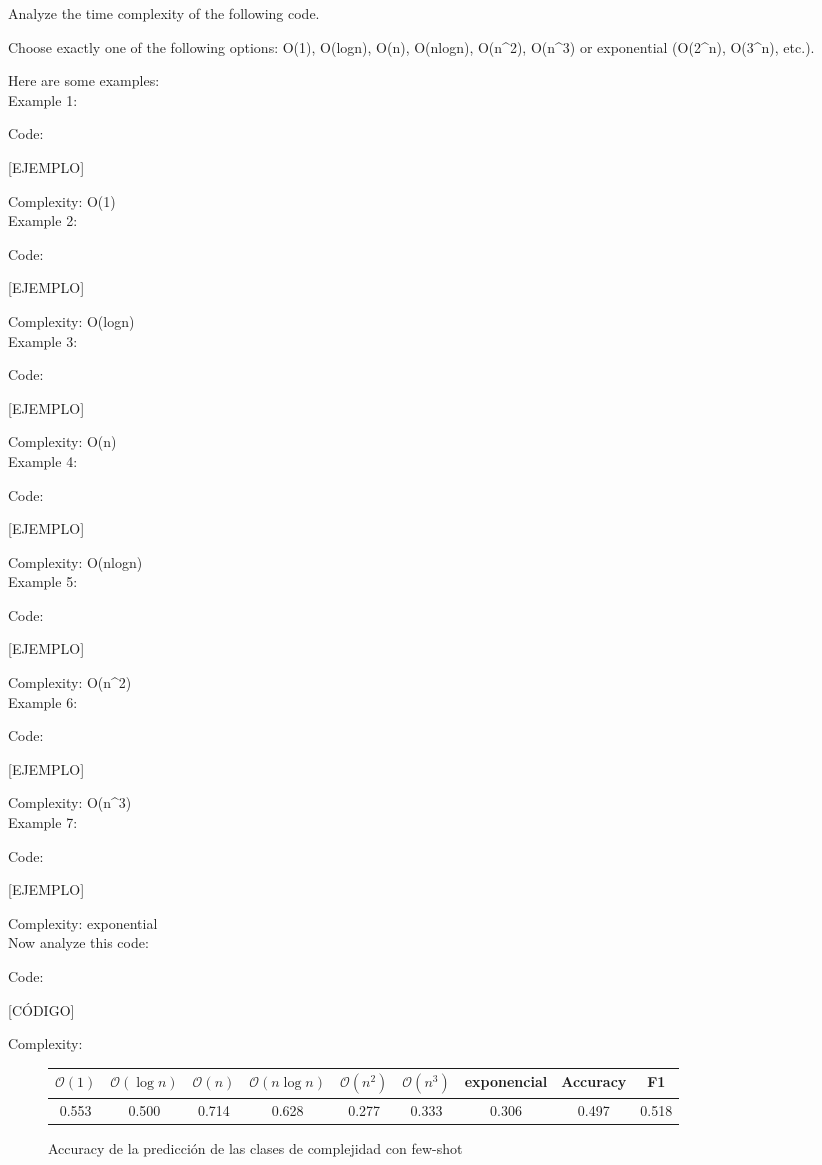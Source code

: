 \documentclass[12pt,twoside]{article}
\begin{document}
\begin{tcolorbox}[
  colback=gray!5,
  colframe=black,
  boxrule=0.5pt,
  breakable,
  title=Prompt few-shot,
]
Analyze the time complexity of the following code.

Choose exactly one of the following options: O(1), O(logn), O(n), O(nlogn), O(n\textasciicircum2), O(n\textasciicircum3) or exponential (O(2\textasciicircum n), O(3\textasciicircum n), etc.).

Here are some examples:
\\[\baselineskip]
Example 1:

Code:

[EJEMPLO]

Complexity: O(1)
\\[\baselineskip]
Example 2:

Code:

[EJEMPLO]

Complexity: O(logn)
\\[\baselineskip]
Example 3:

Code:

[EJEMPLO]

Complexity: O(n)
\\[\baselineskip]
Example 4:

Code:

[EJEMPLO]

Complexity: O(nlogn)
\\[\baselineskip]
Example 5:

Code:

[EJEMPLO]

Complexity: O(n\textasciicircum2)
\\[\baselineskip]
Example 6:

Code:

[EJEMPLO]

Complexity: O(n\textasciicircum3)
\\[\baselineskip]
Example 7:

Code:

[EJEMPLO]

Complexity: exponential
\\[\baselineskip]
Now analyze this code:

Code:

[CÓDIGO]

Complexity:
\end{tcolorbox}

\begin{figure}[H]
    \small
    \begin{tabular}{c c c c c c c|c c}
        $\mathcal{O}(1)$ & $\mathcal{O}(\log n)$ & $\mathcal{O}(n)$ & $\mathcal{O}(n\log n)$ & $\mathcal{O}(n^2)$ & $\mathcal{O}(n^3)$ & exponencial & Accuracy & F1 \\ \hline
        0.553 & 0.500 & 0.714 & 0.628 & 0.277 & 0.333 & 0.306 & 0.497 & 0.518
    \end{tabular}
    \normalsize
    \centering
    \caption{Accuracy de la predicción de las clases de complejidad con few-shot}
    \label{fig:tab_fs}
\end{figure}
\end{document}
